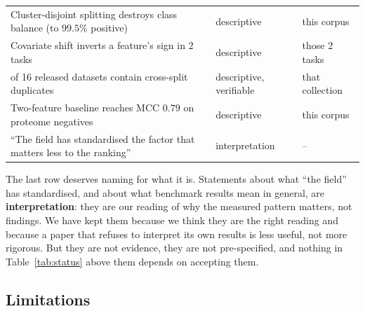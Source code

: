 \documentclass[11pt,a4paper]{article}
\begin{document}
\begin{table}[htbp]
\begin{tabular}{>{\raggedright\arraybackslash}p{}%
                >{\raggedright\arraybackslash}p{}%
                >{\raggedright\arraybackslash}p{}}
Cluster-disjoint splitting destroys class balance (to $99.5\%$ positive)
  & descriptive & this corpus \\
Covariate shift inverts a feature's sign in 2 tasks & descriptive & those 2 tasks \\
11 of 16 released datasets contain cross-split duplicates & descriptive, verifiable
  & that collection \\
Two-feature baseline reaches MCC $0.79$ on proteome negatives & descriptive & this corpus \\
\addlinespace
``The field has standardised the factor that matters less to the ranking''
  & interpretation & -- \\
\bottomrule
\end{tabular}
\end{table}

The last row deserves naming for what it is. Statements about what ``the field'' has
standardised, and about what benchmark results mean in general, are \textbf{interpretation}:
they are our reading of why the measured pattern matters, not findings. We have kept them
because we think they are the right reading and because a paper that refuses to interpret
its own results is less useful, not more rigorous. But they are not evidence, they are not
pre-specified, and nothing in Table~\ref{tab:status} above them depends on accepting them.

\subsection{Limitations}
\end{document}
